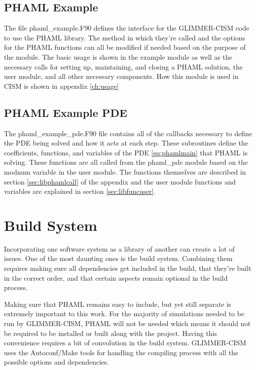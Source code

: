\subsection{PHAML Example}

The file phaml\_example.F90 defines the interface for the GLIMMER-CISM code to use the PHAML library.  The method in which they're called and the options for the PHAML functions can all be modified if needed based on the purpose of the module.  The basic usage is shown in the example module as well as the necessary calls for setting up, maintaining, and closing a PHAML solution, the user module, and all other necessary components.  How this module is used in CISM is shown in appendix \ref{ch:usage}

\subsection{PHAML Example PDE}

The phaml\_example\_pde.F90 file contains all of the callbacks necessary to define the PDE being solved and how it acts at each step.  These subroutines define the coefficients, functions, and variables of the PDE \ref{eq:phamlmain} that PHAML is solving.  These functions are all called from the phaml\_pde module based on the modnum variable in the user module.  The functions themselves are described in section \ref{sec:libphamlcall} of the appendix and the user module functions and variables are explained in section \ref{sec:libfuncuser}. 

\section{Build System}\label{sec:ch4make}

Incorporating one software system as a library of another can create a lot of issues.  One of the most daunting ones is the build system.  Combining them requires making sure all dependencies get included in the build, that they're built in the correct order, and that certain aspects remain optional in the build process.

Making sure that PHAML remains easy to include, but yet still separate is extremely important to this work.  For the majority of simulations needed to be run by GLIMMER-CISM, PHAML will not be needed which means it should not be required to be installed or built along with the project.  Having this convenience requires a bit of convolution in the build system.  GLIMMER-CISM uses the Autoconf/Make tools for handling the compiling process with all the possible options and dependencies.  

